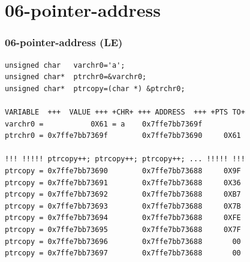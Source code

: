\documentclass[aspectratio=169, xcolor=table, notheorems, hyperref={pdfpagelabels=false}]{beamer}
\begin{document}
\section{06-pointer-address}
\begin{frame}[fragile]
\frametitle{06-pointer-address (LE)}
\begin{lstlisting}[basicstyle=\ttfamily\footnotesize]
unsigned char   varchr0='a';
unsigned char*  ptrchr0=&varchr0;
unsigned char*  ptrcopy=(char *) &ptrchr0;

VARIABLE  +++  VALUE +++ +CHR+ +++ ADDRESS  +++ +PTS TO+
varchr0 =           0X61 = a    0x7ffe7bb7369f
ptrchr0 = 0x7ffe7bb7369f        0x7ffe7bb73690     0X61

!!! !!!!! ptrcopy++; ptrcopy++; ptrcopy++; ... !!!!! !!!
ptrcopy = 0x7ffe7bb73690        0x7ffe7bb73688     0X9F
ptrcopy = 0x7ffe7bb73691        0x7ffe7bb73688     0X36
ptrcopy = 0x7ffe7bb73692        0x7ffe7bb73688     0XB7
ptrcopy = 0x7ffe7bb73693        0x7ffe7bb73688     0X7B
ptrcopy = 0x7ffe7bb73694        0x7ffe7bb73688     0XFE
ptrcopy = 0x7ffe7bb73695        0x7ffe7bb73688     0X7F
ptrcopy = 0x7ffe7bb73696        0x7ffe7bb73688       00
ptrcopy = 0x7ffe7bb73697        0x7ffe7bb73688       00
\end{lstlisting}

\end{frame}

\end{document}
